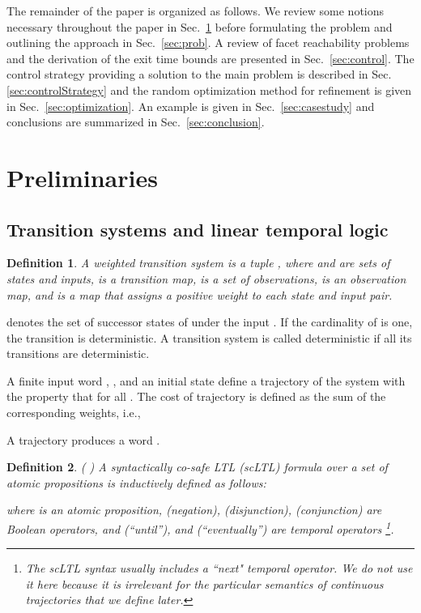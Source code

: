\documentclass{ifacconf}
\newtheorem{definition}{Definition}
\begin{document}
The remainder of the paper is organized as follows. We review some notions necessary throughout the paper in Sec.~\ref{sec:pre} before formulating the problem and outlining the approach in Sec.~\ref{sec:prob}. 
A review of facet reachability problems and the derivation of the exit time bounds are presented in Sec.~\ref{sec:control}. 
The control strategy providing a solution to the main problem is described in Sec.\ref{sec:controlStrategy} and the random optimization method for refinement is given in Sec.~\ref{sec:optimization}. 
An example is given in Sec.~\ref{sec:casestudy} and conclusions are summarized in Sec.~\ref{sec:conclusion}.




\section{Preliminaries}\label{sec:pre}

\subsection{Transition systems and linear temporal logic}
\begin{definition}
A weighted transition system is a tuple , where  and  are sets of states and inputs,  is a transition map,  is a set of observations,  is an observation map, and  is a map that assigns a positive weight to each state and input pair.
\end{definition}

 denotes the set of successor states of  under the input . If the cardinality of  is one, the transition  is deterministic. A transition system  is called deterministic if all its transitions are deterministic.

A finite input word , ,  and an initial state  define a trajectory  of the system with the property that  for all . The cost  of trajectory  is defined as the sum of the corresponding weights, i.e., 

A trajectory  produces a word  .


\begin{definition}( \cite{Vardi:safety}) A syntactically co-safe LTL (scLTL) formula over a set of atomic propositions  is inductively defined as follows:


where  is an atomic proposition,  (negation),  (disjunction),  (conjunction) are Boolean operators, and  (``until''), and  (``eventually'') are temporal operators \footnote{The scLTL syntax usually includes a ``next" temporal operator. We do not use it here 
because it is irrelevant for the particular semantics of continuous trajectories that we define later.}. 
\end{definition}
\end{document}
